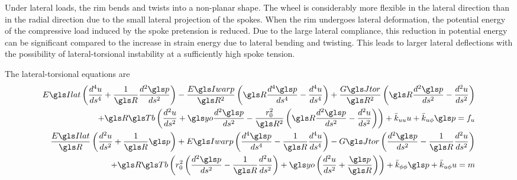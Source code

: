 \documentclass[\rootdir/thesis.tex]{subfiles}
\begin{document}
Under lateral loads, the rim bends and twists into a non-planar shape. The wheel is considerably more flexible in the lateral direction than in the radial direction due to the small lateral projection of the spokes. When the rim undergoes lateral deformation, the potential energy of the compressive load induced by the spoke pretension is reduced. Due to the large lateral compliance, this reduction in potential energy can be significant compared to the increase in strain energy due to lateral bending and twisting. This leads to larger lateral deflections with the possibility of lateral-torsional instability at a sufficiently high spoke tension.

The lateral-torsional equations are
\begin{subequations}
\label{eq:lat_ode_2}
\begin{align}
\begin{split}
  \EIl\left( \ds{u}{4} + \frac{1}{\R}\ds{\p}{2} \right)
  - \frac{\EIw}{\R^2}\left( \R\ds{\p}{4} - \ds{u}{4} \right)
  + \frac{\GJ}{\R^2}\left( \R\ds{\p}{2} - \ds{u}{2} \right)\\
  + \R\Tb\left( \ds{u}{2} + \yo\ds{\p}{2}
                  -\frac{\ro^2}{\R^2}\left(\R\ds{\p}{2}
                                          -\ds{u}{2}\right) \right)
  + \kuu u + \kup \p = f_u
\end{split}\\
\begin{split}
  \frac{\EIl}{\R}\left( \ds{u}{2} + \frac{1}{\R}\p \right)
  + \EIw\left( \ds{\p}{4} - \frac{1}{\R}\ds{u}{4} \right)
  - \GJ\left( \ds{\p}{2} - \frac{1}{\R}\ds{u}{2} \right)\\
  + \R\Tb\left(\ro^2\left(\ds{\p}{2} - \frac{1}{\R}\ds{u}{2}\right)
                  +\yo\left( \ds{u}{2} + \frac{\p}{\R} \right)\right)
  + \kpp \p + \kup u = m
\end{split}
\end{align}
\end{subequations}
\end{document}
